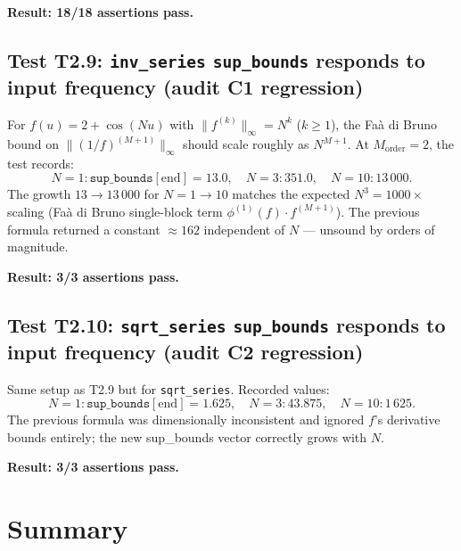 \documentclass[11pt]{article}
\theoremstyle{definition}
\begin{document}
\textbf{Result: 18/18 assertions pass.}

\subsection{Test T2.9: \texttt{inv\_series} \texttt{sup\_bounds} responds to input frequency
            (audit C1 regression)}

For $f(u) = 2 + \cos(Nu)$ with $\|f^{(k)}\|_\infty = N^k$ ($k \ge 1$),
the Fa\`a di Bruno bound on $\|(1/f)^{(M+1)}\|_\infty$ should scale roughly
as $N^{M+1}$. At $M_{\mathrm{order}} = 2$, the test records:
\[
  N = 1: \texttt{sup\_bounds}[\mathrm{end}] = 13.0,
  \quad N = 3: 351.0,
  \quad N = 10: 13\,000.
\]
The growth $13 \to 13\,000$ for $N = 1 \to 10$ matches the expected
$N^3 = 1000\times$ scaling (Fa\`a di Bruno single-block term $\phi^{(1)}(f)\cdot f^{(M+1)}$).
The previous formula returned a constant $\approx 162$ independent of $N$ —
unsound by orders of magnitude.

\textbf{Result: 3/3 assertions pass.}

\subsection{Test T2.10: \texttt{sqrt\_series} \texttt{sup\_bounds} responds to input frequency
            (audit C2 regression)}

Same setup as T2.9 but for \texttt{sqrt\_series}. Recorded values:
\[
  N = 1: \texttt{sup\_bounds}[\mathrm{end}] = 1.625,
  \quad N = 3: 43.875,
  \quad N = 10: 1\,625.
\]
The previous formula was dimensionally inconsistent and ignored $f$'s
derivative bounds entirely; the new sup\_bounds vector correctly grows with $N$.

\textbf{Result: 3/3 assertions pass.}

\section{Summary}
\end{document}
